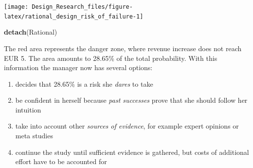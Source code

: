 \documentclass[]{svmono}
\newenvironment{Shaded}{\begin{snugshade}}{\end{snugshade}}
\newcommand{\KeywordTok}[1]{\textcolor[rgb]{0.13,0.29,0.53}{\textbf{#1}}}
\newcommand{\DataTypeTok}[1]{\textcolor[rgb]{0.13,0.29,0.53}{#1}}
\newcommand{\DecValTok}[1]{\textcolor[rgb]{0.00,0.00,0.81}{#1}}
\newcommand{\FloatTok}[1]{\textcolor[rgb]{0.00,0.00,0.81}{#1}}
\newcommand{\StringTok}[1]{\textcolor[rgb]{0.31,0.60,0.02}{#1}}
\newcommand{\OperatorTok}[1]{\textcolor[rgb]{0.81,0.36,0.00}{\textbf{#1}}}
\newcommand{\NormalTok}[1]{#1}
\providecommand{\tightlist}{%
  \setlength{\itemsep}{0pt}\setlength{\parskip}{0pt}}
\begin{document}
\begin{Shaded}
\end{Shaded}

\texttt{[image: Design\_Research\_files/figure-latex/rational\_design\_risk\_of\_failure-1]}

\begin{Shaded}
\begin{Highlighting}[]
\KeywordTok{detach}\NormalTok{(Rational)  }
\end{Highlighting}
\end{Shaded}

The red area represents the danger zone, where revenue increase does not
reach EUR 5. The area amounts to 28.65\% of the total probability. With
this information the manager now has several options:

\begin{enumerate}
\def\labelenumi{\arabic{enumi})}
\tightlist
\item
  decides that 28.65\% is a risk she \emph{dares} to take
\item
  be confident in herself because \emph{past successes} prove that she
  should follow her intuition
\item
  take into account other \emph{sources of evidence}, for example expert
  opinions or meta studies
\item
  continue the study until sufficient evidence is gathered, but costs of
  additional effort have to be accounted for
\end{enumerate}
\end{document}
